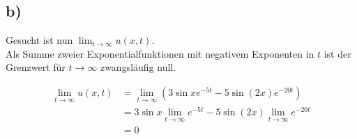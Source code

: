 \newpage

\subsection{b)}

Gesucht ist nun $\lim_{t \rightarrow \infty} u(x,t)$. \\

Als Summe zweier Exponentialfunktionen mit negativem Exponenten in $t$ ist der Grenzwert für $t \rightarrow \infty$ zwangsläufig null.

\begin{align*}
    \lim_{t \rightarrow \infty} u(x,t) &=  \lim_{t \rightarrow \infty} (3 \sin x e^{-5t} - 5 \sin(2x) e^{-20t}) \\
                                       &=  3\sin x \lim_{t \rightarrow \infty} e^{-5t} - 5 \sin(2x) \lim_{t \rightarrow \infty} e^{-20t} \\
                                       &= 0
\end{align*}




